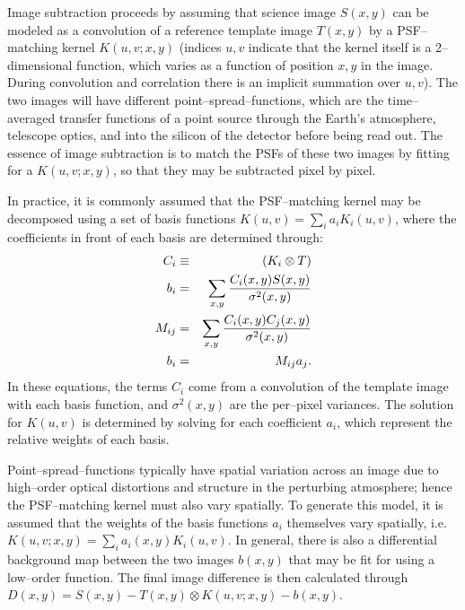 \documentclass[iop]{emulateapj}
\begin{document}
Image subtraction proceeds by assuming that science image $S(x,y)$ can be modeled as a convolution of a reference template image $T(x,y)$ by a PSF--matching kernel $K(u,v;x,y)$ (indices $u,v$ indicate that the kernel itself is a 2--dimensional function, which varies as a function of position $x,y$ in the image.
During convolution and correlation there is an implicit summation over $u,v$).
The two images will have different point--spread--functions, which are the time--averaged transfer functions of a point source through the Earth's atmosphere, telescope optics, and into the silicon of the detector before being read out.
The essence of image subtraction is to match the PSFs of these two images by fitting for a $K(u,v;x,y)$, so that they may be subtracted pixel by pixel.

In practice, it is commonly assumed that the PSF--matching kernel may be decomposed using a set of basis functions $K(u,v) = \sum_i a_i K_i(u,v)$, where the coefficients in front of each basis are determined through:
\begin{eqnarray}
\label{eq-soln}
C_i & \equiv & (K_i \otimes T) \\ 
b_{i}  & = & \sum_{x,y} {{C_i(x,y) S(x,y)}\over{\sigma^2(x,y)}}   \nonumber \\
M_{ij} & = & \sum_{x,y} {{C_i(x,y) C_j(x,y)}\over{\sigma^2(x,y)}}  \nonumber \\
b_{i}  & = & M_{ij} a_{j}. \nonumber
\end{eqnarray}
In these equations, the terms $C_i$ come from a convolution of the template image with each basis function, and $\sigma^2(x,y)$ are the per--pixel variances.
The solution for $K(u,v)$ is determined by solving for each coefficient $a_i$, which represent the relative weights of each basis.

Point--spread--functions typically have spatial variation across an image due to high--order optical distortions and structure in the perturbing atmosphere; hence the PSF--matching kernel must also vary spatially.
To generate this model, it is assumed that the weights of the basis functions $a_i$ themselves vary spatially, i.e. $K(u,v;x,y) = \sum_i a_i(x,y) K_i(u,v)$.
In general, there is also a differential background map between the two images $b(x,y)$ that may be fit for using a low--order function.
The final image difference is then calculated through $D(x,y) = S(x,y) - T(x,y) \otimes K(u,v;x,y) - b(x,y)$.
\end{document}
